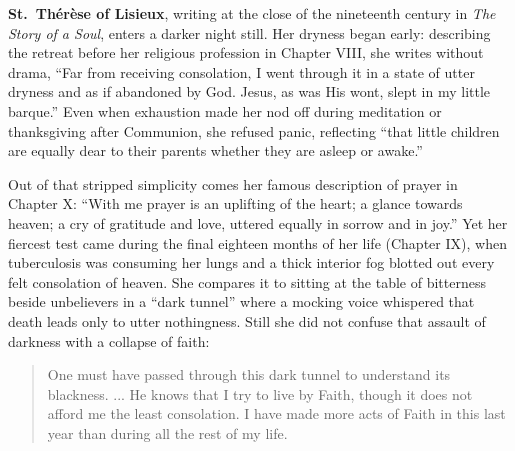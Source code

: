 \textbf{St.\ Th\'er\`ese of Lisieux}, writing at the close of the nineteenth century in \emph{The Story of a Soul}, enters a darker night still. Her dryness began early: describing the retreat before her religious profession in Chapter VIII, she writes without drama, ``Far from receiving consolation, I went through it in a state of utter dryness and as if abandoned by God. Jesus, as was His wont, slept in my little barque.'' Even when exhaustion made her nod off during meditation or thanksgiving after Communion, she refused panic, reflecting ``that little children are equally dear to their parents whether they are asleep or awake.''

Out of that stripped simplicity comes her famous description of prayer in Chapter X: ``With me prayer is an uplifting of the heart; a glance towards heaven; a cry of gratitude and love, uttered equally in sorrow and in joy.'' Yet her fiercest test came during the final eighteen months of her life (Chapter IX), when tuberculosis was consuming her lungs and a thick interior fog blotted out every felt consolation of heaven. She compares it to sitting at the table of bitterness beside unbelievers in a ``dark tunnel'' where a mocking voice whispered that death leads only to utter nothingness. Still she did not confuse that assault of darkness with a collapse of faith:

\begin{quote}
One must have passed through this dark tunnel to understand its blackness. ... He knows that I try to live by Faith, though it does not afford me the least consolation. I have made more acts of Faith in this last year than during all the rest of my life.
\end{quote}
